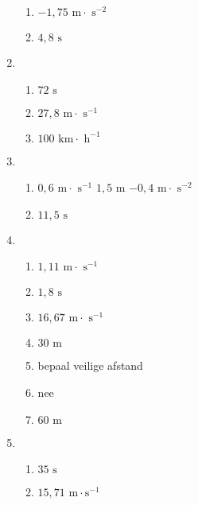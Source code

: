 \begin{multicols}{3}
\begin{enumerate}[noitemsep, label=\textbf{(\arabic*)} ]
\begin{enumerate}[noitemsep, label=\textbf{(\alph*)} ]
 \item $-1,75 \text{ m} \cdot \text{ s}^{-2}$
\item $4,8 \text{ s}$
\end{enumerate}
\item 
\begin{enumerate}[noitemsep, label=\textbf{(\alph*)} ]
 \item $72 \text{ s}$
\item $27,8 \text{ m} \cdot \text{ s}^{-1}$
\item $100 \text{ km} \cdot \text{ h}^{-1}$
\end{enumerate}
\item 
\begin{enumerate}[noitemsep, label=\textbf{(\alph*)} ]
 \item $0,6 \text{ m} \cdot \text{ s}^{-1}$ $1,5 \text{ m}$ $-0,4 \text{ m} \cdot \text{ s}^{-2}$
\item $11,5 \text{ s}$
\end{enumerate}
\item 
\begin{enumerate}[noitemsep, label=\textbf{(\alph*)} ]
 \item $1,11 \text{ m} \cdot \text{ s}^{-1}$
\item $1,8 \text{ s}$
\item $16,67 \text{ m} \cdot \text{ s}^{-1}$
\item $30 \text{ m}$
 \item bepaal veilige afstand
\item nee
\item $60 \text{ m}$
\end{enumerate}
\item 
\begin{enumerate}[noitemsep, label=\textbf{(\alph*)} ]
 \item $35 \text{ s}$
\item $15,71 \text{ m}\cdot\text{s}^{-1}$
\end{enumerate}
 \end{enumerate}
\end{multicols}

